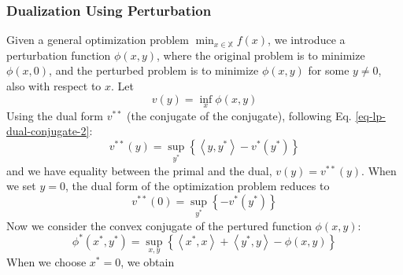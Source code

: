 \documentclass[letterpaper, 11pt]{article}
\numberwithin{equation}{section}
\begin{document}
\subsubsection{Dualization Using Perturbation}
\label{sec:orgaa40aed}
Given a general optimization problem \(\min_{x \in \mathbb{X}} f(x)\), we introduce a perturbation function \(\phi(x,y)\), where the original problem is
to minimize \(\phi(x,0)\), and the perturbed problem is to minimize \(\phi(x,y)\) for some \(y \not = 0\), also with respect to \(x\). Let
\begin{equation}
\label{eq-lp-dual-lagrangian-a}
v(y) = \inf_{x} \phi(x,y)
\end{equation}
Using the dual form \(v^{**}\) (the conjugate of the conjugate), following Eq. \ref{eq-lp-dual-conjugate-2}:
\begin{equation}
\label{eq-lp-dual-lagrangian-b}
v^{**}(y) = \sup_{y^*} \left \{ \left< y,y^* \right> - v^*(y^*) \right \}
\end{equation}
and we have equality between the primal and the dual, \(v(y) = v^{**}(y)\). When we set \(y = 0\), the dual form of the optimization
problem reduces to
\begin{equation}
\label{eq-lp-dual-lagrangian-b}
v^{**}(0) = \sup_{y^*} \left \{- v^*(y^*) \right \}
\end{equation}
Now we consider the convex conjugate of the pertured function \(\phi(x,y)\):
\begin{equation}
\label{eq-lp-dual-phi-conjugate}
\phi^{*}(x^*,y^*) = \sup_{x, y} \left \{ \left< x^*,x \right> + \left< y^*,y \right> - \phi(x,y) \right \}
\end{equation}
When we choose \(x^* = 0\), we obtain
\end{document}
